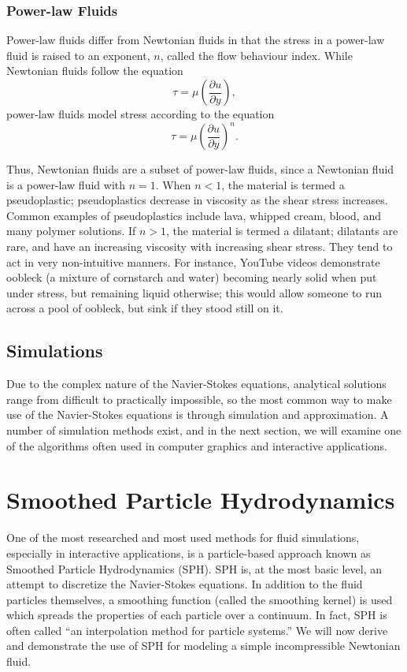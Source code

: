 \documentclass[a4paper]{article}
\begin{document}
\subsubsection{Power-law Fluids}
Power-law fluids differ from Newtonian fluids in that the stress in a power-law fluid is raised to an exponent, $n$, called the flow behaviour index. While Newtonian fluids follow the equation
\[\tau = \mu \left( \frac{\partial u}{\partial y} \right),\]
power-law fluids model stress according to the equation
\[\tau = \mu \left( \frac{\partial u}{\partial y} \right)^n.\]


Thus, Newtonian fluids are a subset of power-law fluids, since a Newtonian fluid is a power-law fluid with $n=1$. When $n<1$, the material is termed a pseudoplastic; pseudoplastics decrease in viscosity as the shear stress increases. Common examples of pseudoplastics include lava, whipped cream, blood, and many polymer solutions. If $n>1$, the material is termed a dilatant; dilatants are rare, and have an increasing viscosity with increasing shear stress. They tend to act in very non-intuitive manners. For instance, YouTube videos demonstrate oobleck (a mixture of cornstarch and water) becoming nearly solid when put under stress, but remaining liquid otherwise; this would allow someone to run across a pool of oobleck, but sink if they stood still on it.

\subsection{Simulations}
Due to the complex nature of the Navier-Stokes equations, analytical solutions range from difficult to practically impossible, so the most common way to make use of the Navier-Stokes equations is through simulation and approximation. A number of simulation methods exist, and in the next section, we will examine one of the algorithms often used in computer graphics and interactive applications.

\section{Smoothed Particle Hydrodynamics}
One of the most researched and most used methods for fluid simulations, especially in interactive applications, is a particle-based approach known as Smoothed Particle Hydrodynamics (SPH). SPH is, at the most basic level, an attempt to discretize the Navier-Stokes equations. In addition to the fluid particles themselves, a smoothing function (called the smoothing kernel) is used which spreads the properties of each particle over a continuum. In fact, SPH is often called ``an interpolation method for particle systems.'' We will now derive and demonstrate the use of SPH for modeling a simple incompressible Newtonian fluid.
\end{document}
